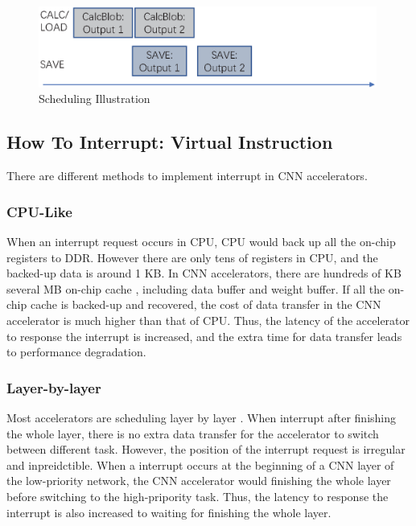\begin{figure}[t]
    \centering
	\includegraphics[width=0.99\textwidth]{fig/singlesave.eps} 	
    \caption{
		Scheduling Illustration
    }
	\label{fig:singlesave}
\end{figure}

\subsection{How To Interrupt: Virtual Instruction}
\label{sec:howinter}

There are different methods to implement interrupt in CNN accelerators.

\subsubsection{CPU-Like}
When an interrupt request occurs in CPU, CPU would back up all the on-chip registers to DDR. However there are only tens of registers in CPU, and the backed-up data is around 1 KB. In CNN accelerators, there are hundreds of KB ~ several MB on-chip cache \cite{qiu2016going, yu2018instruction}, including data buffer and weight buffer. If all the on-chip cache is backed-up and recovered, the cost of data transfer in the CNN accelerator is much higher than that of CPU. Thus, the latency of the accelerator to response the interrupt is increased, and the extra time for data transfer leads to performance degradation.

\subsubsection{Layer-by-layer}
Most accelerators are scheduling layer by layer \cite{qiu2016going,guo2017angel}. When interrupt after finishing the whole layer, there is no extra data transfer for the accelerator to switch between different task. However, the position of the interrupt request is irregular and inpreidctible. When a interrupt occurs at the beginning of a CNN layer of the low-priority network, the CNN accelerator would finishing the whole layer before switching to the high-pripority task. Thus, the latency to response the interrupt is also increased to waiting for finishing the whole layer.

